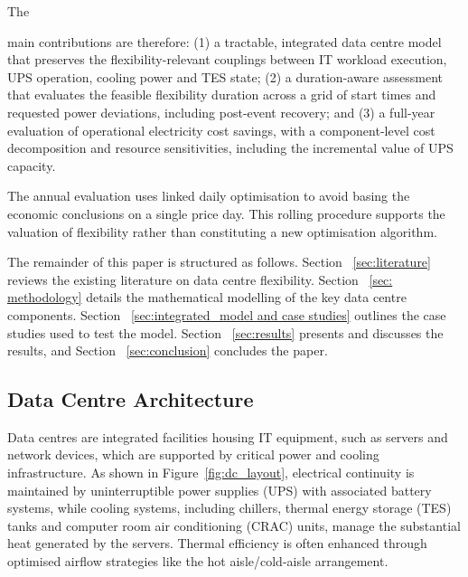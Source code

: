 \documentclass[lettersize,journal]{IEEEtran}
\providecommand{\DIFadd}[1]{{\color{blue}#1}}
\providecommand{\DIFaddbegin}{}
\providecommand{\DIFaddend}{}
\begin{document}
The \DIFaddbegin \DIFadd{main contributions are therefore: (1) a tractable, integrated data centre model that preserves the flexibility-relevant couplings between IT workload execution, UPS operation, cooling power and TES state; (2) a duration-aware assessment that evaluates the feasible flexibility duration across a grid of start times and requested power deviations, including post-event recovery; and (3) a full-year evaluation of operational electricity cost savings, with a component-level cost decomposition and resource sensitivities, including the incremental value of UPS capacity.

}

\DIFadd{The annual evaluation uses linked daily optimisation to avoid basing the economic conclusions on a single price day. This rolling procedure supports the valuation of flexibility rather than constituting a new optimisation algorithm.

}

\DIFadd{The }\DIFaddend remainder of this paper is structured as follows. Section \DIFaddbegin \DIFadd{~\ref{sec:literature} }\DIFaddend reviews the existing literature on data centre flexibility. Section \DIFaddbegin \DIFadd{~\ref{sec: methodology} }\DIFaddend details the mathematical modelling of the key data centre components. Section \DIFaddbegin \DIFadd{~\ref{sec:integrated_model and case studies} }\DIFaddend outlines the case studies used to test the model. Section \DIFaddbegin \DIFadd{~\ref{sec:results} }\DIFaddend presents and discusses the results, and Section \DIFaddbegin \DIFadd{~\ref{sec:conclusion} }\DIFaddend concludes the paper. 

\subsection{Data Centre Architecture}
 \DIFaddbegin \DIFadd{Data centres }\DIFaddend are integrated facilities housing IT equipment, such as servers and network devices, which are supported by critical power and cooling infrastructure. As shown in Figure~\ref{fig:dc_layout}, electrical continuity is maintained by uninterruptible power supplies (UPS) with associated battery systems, while cooling systems, including chillers,  \DIFaddbegin \DIFadd{thermal energy storage }\DIFaddend (TES) tanks and  \DIFaddbegin \DIFadd{computer room air conditioning }\DIFaddend (CRAC) units, manage the substantial heat generated by the servers. Thermal efficiency is often enhanced through optimised airflow strategies like the  \DIFaddbegin \DIFadd{hot aisle}\DIFaddend /cold-aisle arrangement.
\end{document}
